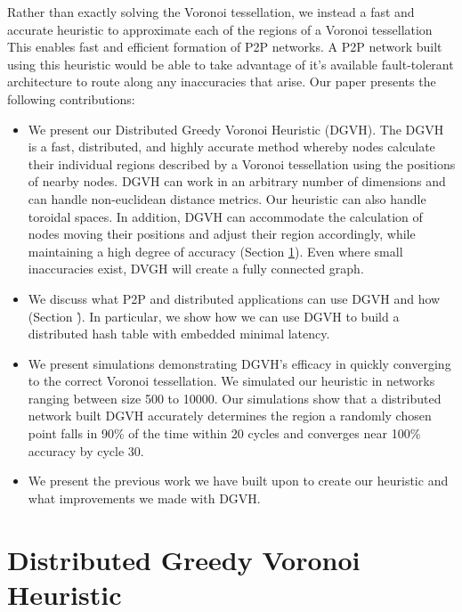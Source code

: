 \documentclass[11pt, conference, letterpaper]{IEEEtran}
\begin{document}
Rather than exactly solving the Voronoi tessellation, we instead a fast and accurate heuristic to approximate each of the regions of a Voronoi tessellation
This enables fast and efficient formation of P2P networks.
A P2P network built using this heuristic would be able to take advantage of it's available fault-tolerant architecture to route along any inaccuracies that arise.
Our paper presents the following contributions:
\begin{itemize}
	\item We present our Distributed Greedy Voronoi Heuristic (DGVH). 
	The DGVH is a fast, distributed, and highly accurate method whereby nodes calculate their individual regions described by a Voronoi tessellation using the positions of nearby nodes.
	DGVH can work in an arbitrary number of dimensions and can handle non-euclidean distance metrics.
    Our heuristic can also handle toroidal spaces.
	In addition, DGVH can accommodate the calculation of nodes moving their positions and adjust their region accordingly, while maintaining a high degree of accuracy (Section \ref{sec:dgvh}).
    Even where small inaccuracies exist, DVGH will create a fully connected graph.
	\item We discuss what P2P and distributed applications can use DGVH and how  (Section \r).
	In particular, we show how we can use DGVH to build a distributed hash table with embedded minimal latency.
	\item We present simulations demonstrating DGVH's efficacy in quickly converging to the correct Voronoi tessellation.
    We simulated our heuristic in networks ranging between size 500 to 10000.
	Our simulations show that a distributed network built DGVH accurately determines the region a randomly chosen point falls in 90\% of the time within 20 cycles and converges near 100\% accuracy by cycle 30.
	\item We present the previous work we have built upon to create our heuristic and what improvements we made with DGVH.
	
\end{itemize}


\section{Distributed Greedy Voronoi Heuristic}
\label{sec:dgvh}
\end{document}

